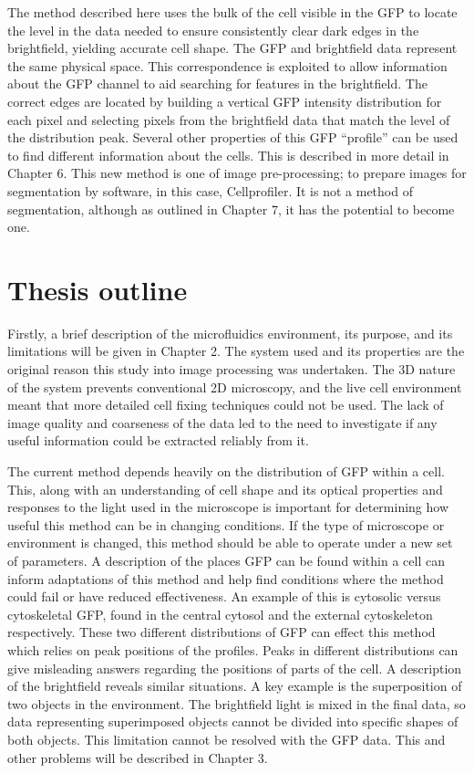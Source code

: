 The method described here uses the bulk of the cell visible in the GFP to locate the level in the data needed to ensure consistently clear dark edges in the brightfield, yielding accurate cell shape. The GFP and brightfield data represent the same physical space. This correspondence is exploited to allow information about the GFP channel to aid searching for features in the brightfield. The correct edges are located by building a vertical GFP intensity distribution for each pixel and selecting pixels from the brightfield data that match the level of the distribution peak. Several other properties of this GFP ``profile'' can be used to find different information about the cells. This is described in more detail in Chapter 6. This new method is one of image pre-processing; to prepare images for segmentation by software, in this case, Cellprofiler. It is not a method of segmentation, although as outlined in Chapter 7, it has the potential to become one.

\section{Thesis outline}

Firstly, a brief description of the microfluidics environment, its purpose, and its limitations will be given in Chapter 2. The system used and its properties are the original reason this study into image processing was undertaken. The 3D nature of the system prevents conventional 2D microscopy, and the live cell environment meant that more detailed cell fixing techniques could not be used. The lack of image quality and coarseness of the data led to the need to investigate if any useful information could be extracted reliably from it.

The current method depends heavily on the distribution of GFP within a cell. This, along with an understanding of cell shape and its optical properties and responses to the light used in the microscope is important for determining how useful this method can be in changing conditions. If the type of microscope or environment is changed, this method should be able to operate under a new set of parameters. A description of the places GFP can be found within a cell can inform adaptations of this method and help find conditions where the method could fail or have reduced effectiveness. An example of this is cytosolic versus cytoskeletal GFP, found in the central cytosol and the external cytoskeleton respectively. These two different distributions of GFP can effect this method which relies on peak positions of the profiles. Peaks in different distributions can give misleading answers regarding the positions of parts of the cell. A description of the brightfield reveals similar situations. A key example is the superposition of two objects in the environment. The brightfield light is mixed in the final data, so data representing superimposed objects cannot be divided into specific shapes of both objects. This limitation cannot be resolved with the GFP data. This and other problems will be described in Chapter 3.

